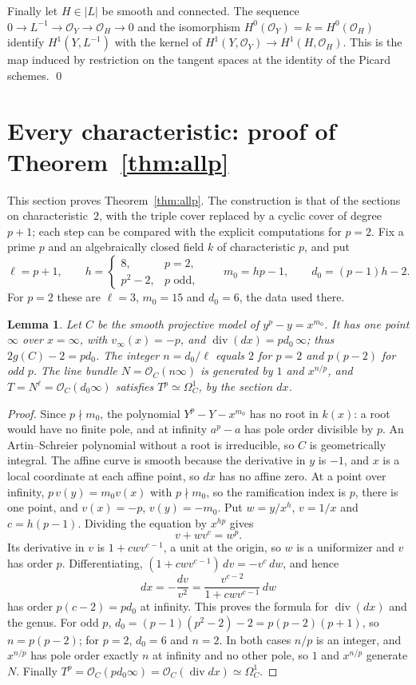 \documentclass[11pt,a4paper]{article}
\theoremstyle{plain}
\newtheorem{lemma}[theorem]{Lemma}
\theoremstyle{remark}
\newcommand{\OO}{\mathcal O}
\begin{document}
Finally let $H\in|L|$ be smooth and connected. The sequence $0\to L^{-1}\to\OO_Y\to\OO_H\to0$ and the isomorphism
$H^0(\OO_Y)=k=H^0(\OO_H)$ identify $H^1(Y,L^{-1})$ with the kernel of $H^1(Y,\OO_Y)\to H^1(H,\OO_H)$. This is the map
induced by restriction on the tangent spaces at the identity of the Picard schemes. \qed

\section{Every characteristic: proof of Theorem~\ref{thm:allp}}\label{sec:allp}

This section proves Theorem~\ref{thm:allp}. The construction is that of the sections on characteristic~$2$, with the
triple cover replaced by a cyclic cover of degree $p+1$; each step can be compared with the explicit computations for
$p=2$. Fix a prime $p$ and an algebraically closed field $k$ of characteristic $p$, and put
\[
 \ell=p+1,\qquad h=\begin{cases}8,&p=2,\\ p^2-2,&p\text{ odd},\end{cases}\qquad m_0=hp-1,\qquad d_0=(p-1)h-2 .
\]
For $p=2$ these are $\ell=3$, $m_0=15$ and $d_0=6$, the data used there.

\begin{lemma}\label{lem:allp-curve}
Let $C$ be the smooth projective model of $y^p-y=x^{m_0}$. It has one point $\infty$ over $x=\infty$, with
$v_\infty(x)=-p$, and $\operatorname{div}(dx)=pd_0\,\infty$; thus $2g(C)-2=pd_0$. The integer $n=d_0/\ell$ equals $2$ for
$p=2$ and $p(p-2)$ for odd $p$. The line bundle $N=\OO_C(n\infty)$ is generated by $1$ and $x^{n/p}$, and
$T=N^{\ell}=\OO_C(d_0\infty)$ satisfies $T^{p}\simeq\Omega^1_C$, by the section $dx$.
\end{lemma}

\begin{proof}
Since $p\nmid m_0$, the polynomial $Y^p-Y-x^{m_0}$ has no root in $k(x)$: a root would have no finite pole, and at
infinity $a^p-a$ has pole order divisible by $p$. An Artin--Schreier polynomial without a root is irreducible, so $C$ is
geometrically integral. The affine curve is smooth because the derivative in $y$ is $-1$, and $x$ is a local
coordinate at each affine point, so $dx$ has no affine zero. At a point over infinity, $p\,v(y)=m_0v(x)$ with
$p\nmid m_0$, so the ramification index is $p$, there is one point, and $v(x)=-p$, $v(y)=-m_0$. Put $w=y/x^h$,
$v=1/x$ and $c=h(p-1)$. Dividing the equation by $x^{hp}$ gives
\[
 v+wv^c=w^p .
\]
Its derivative in $v$ is $1+cwv^{c-1}$, a unit at the origin, so $w$ is a uniformizer and $v$ has order $p$.
Differentiating, $(1+cwv^{c-1})\,dv=-v^c\,dw$, and hence
\[
 dx=-\frac{dv}{v^2}=\frac{v^{c-2}}{1+cwv^{c-1}}\,dw
\]
has order $p(c-2)=pd_0$ at infinity. This proves the formula for $\operatorname{div}(dx)$ and the genus. For odd $p$,
$d_0=(p-1)(p^2-2)-2=p(p-2)(p+1)$, so $n=p(p-2)$; for $p=2$, $d_0=6$ and $n=2$. In both cases $n/p$ is an integer, and
$x^{n/p}$ has pole order exactly $n$ at infinity and no other pole, so $1$ and $x^{n/p}$ generate $N$. Finally
$T^p=\OO_C(pd_0\infty)=\OO_C(\operatorname{div}dx)\simeq\Omega^1_C$.
\end{proof}
\end{document}
